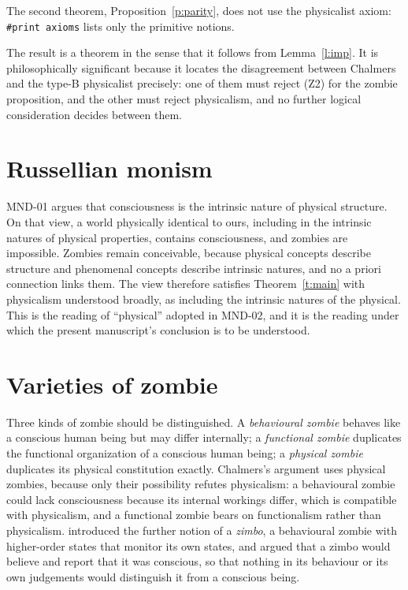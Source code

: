 \documentclass{situationist-preprint}
\begin{document}
The second theorem, Proposition~\ref{p:parity}, does not use the physicalist axiom: \texttt{\#print axioms} lists only the primitive notions.

The result is a theorem in the sense that it follows from Lemma~\ref{l:imp}. It is philosophically significant because it locates the disagreement between Chalmers and the type-B physicalist precisely: one of them must reject (Z2) for the zombie proposition, and the other must reject physicalism, and no further logical consideration decides between them.

\section{Russellian monism}

MND-01 argues that consciousness is the intrinsic nature of physical structure. On that view, a world physically identical to ours, including in the intrinsic natures of physical properties, contains consciousness, and zombies are impossible. Zombies remain conceivable, because physical concepts describe structure and phenomenal concepts describe intrinsic natures, and no a priori connection links them. The view therefore satisfies Theorem~\ref{t:main} with physicalism understood broadly, as including the intrinsic natures of the physical. This is the reading of \enquote{physical} adopted in MND-02, and it is the reading under which the present manuscript's conclusion is to be understood.

\section{Varieties of zombie}

Three kinds of zombie should be distinguished. A \emph{behavioural zombie} behaves like a conscious human being but may differ internally; a \emph{functional zombie} duplicates the functional organization of a conscious human being; a \emph{physical zombie} duplicates its physical constitution exactly. Chalmers's argument uses physical zombies, because only their possibility refutes physicalism: a behavioural zombie could lack consciousness because its internal workings differ, which is compatible with physicalism, and a functional zombie bears on functionalism rather than physicalism. \citet{Dennett1991} introduced the further notion of a \emph{zimbo}, a behavioural zombie with higher-order states that monitor its own states, and argued that a zimbo would believe and report that it was conscious, so that nothing in its behaviour or its own judgements would distinguish it from a conscious being.
\end{document}

